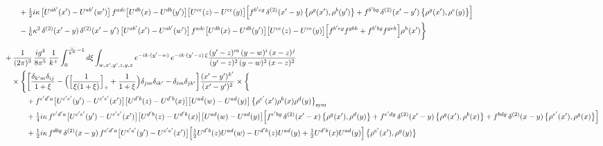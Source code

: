 \documentclass[10pt]{article}
\numberwithin{equation}{section}
\begin{document}
\begin{align}
&\qquad+\tfrac12 i\kappa\,\big[U^{ab^{\prime}}(x^{\prime})-U^{ab^{\prime}}(w^{\prime})\big]\,f^{adc}\big[U^{db}(x)-U^{db}(y^{\prime})\big]\big[U^{ce}(z)-U^{ce}(y)\big]\Big[f^{b^{\prime}eg}\,\delta^{(2)}(x^{\prime}-y)\,\big\{\rho^{g}(x^{\prime}),\rho^{b}(y^{\prime})\big\}+f^{b^{\prime}bg}\,\delta^{(2)}(x^{\prime}-y^{\prime})\,\big\{\rho^{g}(x^{\prime}),\rho^{e}(y)\big\}\Big]\notag\\
&\qquad-\tfrac16\kappa^{2}\,\delta^{(2)}(x^{\prime}-y)\,\delta^{(2)}(x^{\prime}-y^{\prime})\,\big[U^{ab^{\prime}}(x^{\prime})-U^{ab^{\prime}}(w^{\prime})\big]\,f^{adc}\big[U^{db}(x)-U^{db}(y^{\prime})\big]\big[U^{ce}(z)-U^{ce}(y)\big]\Big[f^{b^{\prime}eg}f^{gbh}+f^{b^{\prime}bg}f^{geh}\Big]\rho^{h}(x^{\prime})\bigg\}\notag\\[6pt]
&+\frac{1}{(2\pi)^{3}}\,\frac{ig^{4}}{8\pi^{5}}\,\frac{1}{k^{+}}\int_{0}^{\frac{\vee}{k^{+}}-1}d\xi\int_{w,x^{\prime},y^{\prime},z,y,x}e^{-ik\cdot(y^{\prime}-w)}\,e^{-ik\cdot(y^{\prime}-z)\,\xi}\frac{(y^{\prime}-z)^{m}\,(y-w)^{i}\,(x-z)^{j}}{(y^{\prime}-z)^{2}\,(y-w)^{2}\,(x-z)^{2}}\notag\\
&\quad\times\Bigg\{\bigg[\frac{\delta_{k^{\prime}m}\delta_{ij}}{1+\xi}-\Big(\Big[\frac{1}{\xi(1+\xi)}\Big]_{+}+\frac{1}{1+\xi}\Big)\delta_{jm}\delta_{ik^{\prime}}-\delta_{im}\delta_{jk^{\prime}}\bigg]\frac{(x^{\prime}-y^{\prime})^{k^{\prime}}}{(x^{\prime}-y^{\prime})^{2}}\times\bigg\{\notag\\
&\qquad\quad+f^{c^{\prime}d^{\prime}a}\big[U^{c^{\prime}e^{\prime}}(y^{\prime})-U^{c^{\prime}e^{\prime}}(x^{\prime})\big]\big[U^{d^{\prime}b}(z)-U^{d^{\prime}b}(x)\big]\big[U^{ad}(w)-U^{ad}(y)\big]\,\big\{\rho^{e^{\prime}}(x^{\prime})\rho^{b}(x)\rho^{d}(y)\big\}_{\rm sym}\notag\\
&\qquad\quad+\tfrac14 i\kappa\,f^{c^{\prime}d^{\prime}a}\big[U^{c^{\prime}e^{\prime}}(y^{\prime})-U^{c^{\prime}e^{\prime}}(x^{\prime})\big]\big[U^{d^{\prime}b}(z)-U^{d^{\prime}b}(x)\big]\big[U^{ad}(w)-U^{ad}(y)\big]\Big[f^{e^{\prime}bg}\,\delta^{(2)}(x^{\prime}-x)\,\big\{\rho^{g}(x^{\prime}),\rho^{d}(y)\big\}+f^{e^{\prime}dg}\,\delta^{(2)}(x^{\prime}-y)\,\big\{\rho^{g}(x^{\prime}),\rho^{b}(x)\big\}+f^{bdg}\,\delta^{(2)}(x-y)\,\big\{\rho^{e^{\prime}}(x^{\prime}),\rho^{g}(x)\big\}\Big]\notag\\
&\qquad\quad+\tfrac12 i\kappa\,f^{dbg}\,\delta^{(2)}(x-y)\,f^{c^{\prime}d^{\prime}a}\big[U^{c^{\prime}e^{\prime}}(y^{\prime})-U^{c^{\prime}e^{\prime}}(x^{\prime})\big]\Big[\tfrac12U^{d^{\prime}b}(z)U^{ad}(w)-U^{d^{\prime}b}(z)U^{ad}(y)+\tfrac12U^{d^{\prime}b}(x)U^{ad}(y)\Big]\,\big\{\rho^{e^{\prime}}(x^{\prime}),\rho^{g}(y)\big\}\notag\\

\end{align}
\end{document}
